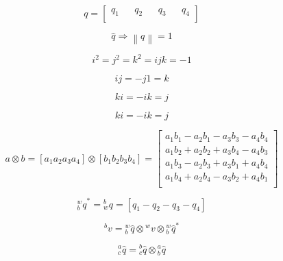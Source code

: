 \begin{equation}
    q =     \begin{bmatrix}
        q_1 &  & q_2 &  & q_3 &  & q_4 \\
    \end{bmatrix}
\end{equation}

\begin{equation}
    \hat{q} \Longrightarrow \left\lVert q\right\rVert =1
\end{equation}

\begin{equation}
    i^2=j^2=k^2=ijk=-1
\end{equation}

\begin{equation}
    ij = -j1 = k
\end{equation}

\begin{equation}
    ki = -ik = j
\end{equation}

\begin{equation}
    ki = -ik = j
\end{equation}

\begin{equation}
    a \otimes b = \left[a_1 a_2 a_3 a_4\right] \otimes \left[b_1 b_2 b_3 b_4\right]     =
    \begin{bmatrix}
        a_1 b_1 - a_2 b_1 - a_3 b_3 - a_4 b_4 \\
        a_1 b_2 + a_2 b_2 + a_3 b_4 - a_4 b_3 \\
        a_1 b_3 - a_2 b_3 + a_3 b_1 + a_4 b_4 \\
        a_1 b_4 + a_2 b_4 - a_3 b_2 + a_4 b_1 \\
    \end{bmatrix}
\end{equation}

\begin{equation}
    \textrm{$_{b}^{w}q$}^* =\textrm{$_{w}^{b}q$} = \left[q_1 - q_2 - q_3 - q_4\right]
\end{equation}

\begin{equation}
    \textrm{$^{b}v$} = \textrm{$_{b}^{w}\hat{q}$} \otimes \textrm{$^{w}v$} \otimes \textrm{$_{b}^{w}\hat{q}$}^*
\end{equation}

\begin{equation}
    \textrm{$_{c}^{a}\hat{q}$} = \textrm{$_{c}^{b}\hat{q}$} \otimes \textrm{$_{b}^{a}\hat{q}$}
\end{equation}

